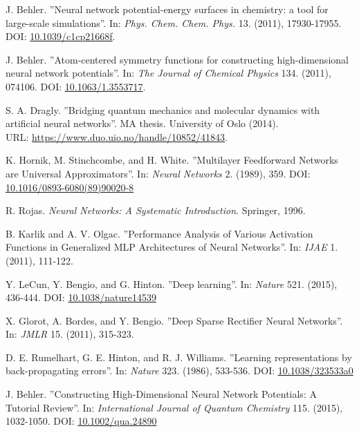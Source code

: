 \documentclass[twoside,english]{uiofysmaster}
\begin{document}
\begin{thebibliography}{56}

 J. Behler.
 ''Neural network potential-energy surfaces in chemistry: a tool for large-scale simulations''.
 In: \textit{Phys. Chem. Chem. Phys.} 13. (2011), 17930-17955. 
 DOI: \href{http://dx.doi.org/10.1039/c1cp21668f}{10.1039/c1cp21668f}. 
 
 J. Behler.
 ''Atom-centered symmetry functions for constructing high-dimensional neural network potentials''.
 In: \textit{The Journal of Chemical Physics} 134. (2011), 074106. 
 DOI: \href{http://dx.doi.org/10.1063/1.3553717}{10.1063/1.3553717}.
 
 S. A. Dragly.
 ''Bridging quantum mechanics and molecular dynamics with artificial neural networks''.
 MA thesis. University of Oslo (2014). \\
 URL: \href{https://www.duo.uio.no/handle/10852/41843}{https://www.duo.uio.no/handle/10852/41843}.

 K. Hornik, M. Stinchcombe, and H. White.
 ''Multilayer Feedforward Networks are Universal Approximators''.
 In: \textit{Neural Networks} 2. (1989), 359. 
 DOI: \href{https://doi.org/10.1016/0893-6080(89)90020-8}{10.1016/0893-6080(89)90020-8}
 
 R. Rojas. 
 \textit{Neural Networks: A Systematic Introduction}.
 Springer, 1996.
 
 B. Karlik and A. V. Olgac.
 ''Performance Analysis of Various Activation Functions in Generalized MLP Architectures of Neural Networks''.
 In: \textit{IJAE} 1. (2011), 111-122.
 
 Y. LeCun, Y. Bengio, and G. Hinton.
 ''Deep learning''.
 In: \textit{Nature} 521. (2015), 436-444. 
 DOI: \href{http://dx.doi.org/10.1038/nature14539}{10.1038/nature14539}
 
 X. Glorot, A. Bordes, and Y. Bengio.
 ''Deep Sparse Rectifier Neural Networks''.
 In: \textit{JMLR} 15. (2011), 315-323.
 
 D. E. Rumelhart, G. E. Hinton, and R. J. Williams.
 ''Learning representations by back-propagating errors''.
 In: \textit{Nature} 323. (1986), 533-536.
 DOI: \href{http://dx.doi.org/10.1038/323533a0}{10.1038/323533a0}
 
 J. Behler.
 ''Constructing High-Dimensional Neural Network Potentials: A Tutorial Review''.
 In: \textit{International Journal of Quantum Chemistry} 115. (2015), 1032-1050.
 DOI: \href{http://dx.doi.org/10.1002/qua.24890}{10.1002/qua.24890}
 

\end{thebibliography}
\end{document}

